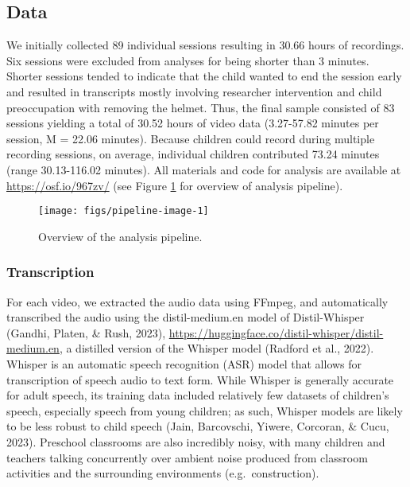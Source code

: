 \documentclass[10pt, letterpaper]{article}
\newenvironment{CodeChunk}{}{}
\begin{document}
\hypertarget{data}{%
\subsection{Data}\label{data}}

We initially collected 89 individual sessions resulting in 30.66 hours
of recordings. Six sessions were excluded from analyses for being
shorter than 3 minutes. Shorter sessions tended to indicate that the
child wanted to end the session early and resulted in transcripts mostly
involving researcher intervention and child preoccupation with removing
the helmet. Thus, the final sample consisted of 83 sessions yielding a
total of 30.52 hours of video data (3.27-57.82 minutes per session, M =
22.06 minutes). Because children could record during multiple recording
sessions, on average, individual children contributed 73.24 minutes
(range 30.13-116.02 minutes). All materials and code for analysis are
available at \url{https://osf.io/967zv/} (see Figure
\ref{fig:pipeline-image} for overview of analysis pipeline).

\begin{CodeChunk}
\begin{figure}[ht!]

{\centering \texttt{[image: figs/pipeline-image-1]} 

}

\caption[Overview of the analysis pipeline]{Overview of the analysis pipeline.}\label{fig:pipeline-image}
\end{figure}
\end{CodeChunk}

\hypertarget{transcription}{%
\subsubsection{Transcription}\label{transcription}}

For each video, we extracted the audio data using FFmpeg, and
automatically transcribed the audio using the distil-medium.en model of
Distil-Whisper (Gandhi, Platen, \& Rush, 2023),
\url{https://huggingface.co/distil-whisper/distil-medium.en}, a
distilled version of the Whisper model (Radford et al., 2022). Whisper
is an automatic speech recognition (ASR) model that allows for
transcription of speech audio to text form. While Whisper is generally
accurate for adult speech, its training data included relatively few
datasets of children's speech, especially speech from young children; as
such, Whisper models are likely to be less robust to child speech (Jain,
Barcovschi, Yiwere, Corcoran, \& Cucu, 2023). Preschool classrooms are
also incredibly noisy, with many children and teachers talking
concurrently over ambient noise produced from classroom activities and
the surrounding environments (e.g.~construction).
\end{document}
